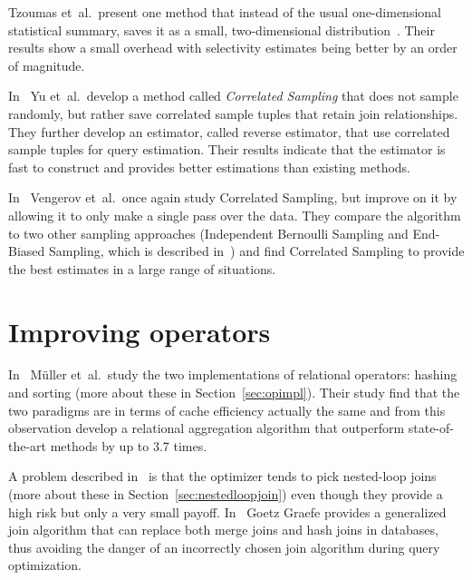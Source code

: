 Tzoumas et\ al.\ present one method that instead of the usual one-dimensional
statistical summary, saves it as a small, two-dimensional
distribution~\cite{tzoumas_2011_lightweight_lgmfsewia}. Their results show a
small overhead with selectivity estimates being better by an order of magnitude.

In~\cite{yu_2013_cs2_candsfqea} Yu et\ al.\ develop a  method called
\textit{Correlated Sampling} that does not sample randomly, but rather save
correlated sample tuples that retain join relationships. They further develop an
estimator, called reverse estimator, that use correlated sample tuples for query
estimation. Their results indicate that the estimator is fast to construct and
provides better estimations than existing methods.

In~\cite{vengerov_2015_join_jsestfc} Vengerov et\ al.\ once again study
Correlated Sampling, but improve on it by allowing it to only make a single pass
over the data. They compare the algorithm to two other sampling approaches
(Independent Bernoulli Sampling and End-Biased Sampling, which is described
in~\cite{estan_2006_end_esfjce}) and find Correlated Sampling to provide the best
estimates in a large range of situations.

\section{Improving operators}
In~\cite{muller_2015_cache_cahis} Müller  et\ al.\ study the two implementations
of relational operators: hashing and sorting (more about these in
Section~\ref{sec:opimpl}). Their study find that the two paradigms are in terms
of cache efficiency actually the same and from this observation develop a
relational aggregation algorithm that outperform state-of-the-art methods by up
to 3.7 times.

A problem described in~\cite{leis_2015_how_hgaqor} is that the optimizer tends
to pick nested-loop joins (more about these in Section~\ref{sec:nestedloopjoin})
even though they provide a high risk but only a very small payoff.
In~\cite{graefe_2011_generalized_agja} Goetz Graefe provides a generalized join
algorithm that can replace both merge joins and hash joins in databases, thus
avoiding the danger of an incorrectly chosen join algorithm during query optimization.

